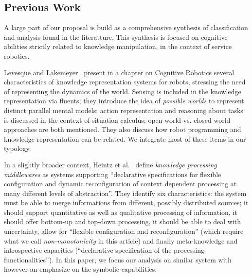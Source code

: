 \documentclass[a4paper, twocolumn]{article}
\begin{document}
\subsection{Previous Work}
\label{sect|evaluation-literature}

A large part of our proposal is build as a comprehensive synthesis of
classification and analysis found in the literatture. This synthesis is focused
on cognitive abilities strictly related to knowledge manipulation, in the
context of service robotics.

Levesque and Lakemeyer~\cite{Levesque2008} present in a chapter on Cognitive
Robotics several characteristics of knowledge representation systems for
robots, stressing the need of representing the dynamics of the world.  Sensing
is included in the knowledge representation via fluents; they introduce the
idea of \emph{possible worlds} to represent distinct parallel mental models;
action representation and reasoning about tasks is discussed in the context of
situation calculus; open world vs. closed world approaches are both mentioned.
They also discuss how robot programming and knowledge representation can be
related. We integrate most of these items in our typology.

In a slightly broader context, Heintz et al.~\cite{Heintz2008} define
\emph{knowledge processing middlewares} as systems supporting ``declarative
specifications for flexible configuration and dynamic reconfiguration of
context dependent processing at many different levels of abstraction''. They
identify six characteristics: the system must be able to merge informations
from different, possibly distributed sources; it should support quantitative as
well as qualitative processing of information, it should offer bottom-up and
top-down processing, it should be able to deal with uncertainty, allow for
``flexible configuration and reconfiguration'' (which require what we call
\emph{non-monotonicity} in this article) and finally meta-knowledge and
introspective capacities (``declarative specification of the processing
functionalities''). In this paper, we focus our analysis on similar system with
however an emphasize on the symbolic capabilities.
\end{document}
